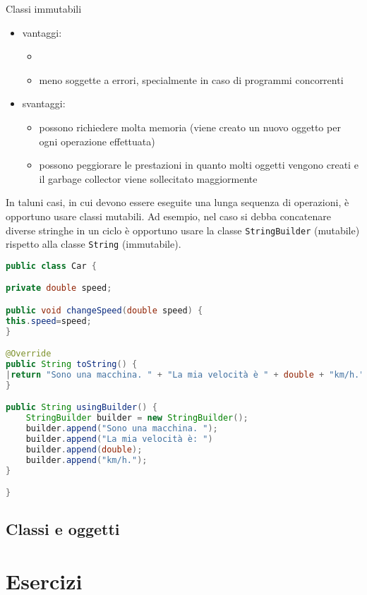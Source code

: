 \documentclass{article}
\begin{document}
Classi immutabili
\begin{itemize}
\item vantaggi:
\begin{itemize}
\item %
\item meno soggette a errori, specialmente in caso di programmi concorrenti
\end{itemize}
\item svantaggi:
\begin{itemize}
\item possono richiedere molta memoria (viene creato un nuovo oggetto per ogni operazione effettuata)
\item possono peggiorare le prestazioni in quanto molti oggetti vengono creati e il garbage collector viene sollecitato maggiormente
\end{itemize}
\end{itemize}

In taluni casi, in cui devono essere eseguite una lunga sequenza di operazioni, è opportuno usare classi mutabili.
Ad esempio, nel caso si debba concatenare diverse stringhe in un ciclo è opportuno usare la classe
\texttt{StringBuilder} (mutabile) rispetto alla classe \texttt{String} (immutabile).

\begin{lstlisting}[language=Java,escapechar=|]
public class Car {

private double speed;

public void changeSpeed(double speed) {
this.speed=speed;   
}

@Override
public String toString() {
|return "Sono una macchina. " + "La mia velocità è " + double + "km/h.";|
}

public String usingBuilder() {
	StringBuilder builder = new StringBuilder();
	builder.append("Sono una macchina. ");
    builder.append("La mia velocità è: ")
	builder.append(double);
	builder.append("km/h.");
}

}
\end{lstlisting}

\subsection{Classi e oggetti}


\section{Esercizi}
\end{document}
